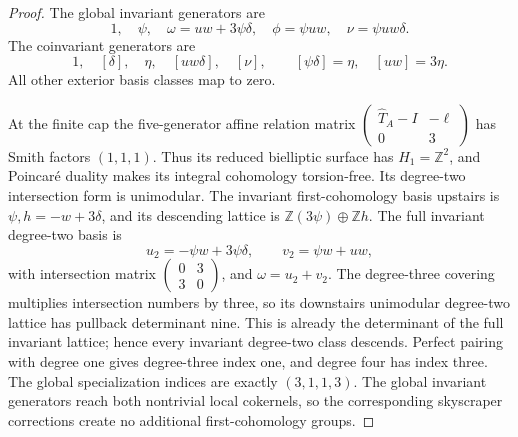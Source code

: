 \begin{proof}
The global invariant generators are \[
 1,\quad\psi,\quad\omega=uw+3\psi\delta,
 \quad\phi=\psi uw,\quad\nu=\psi uw\delta.
\] The coinvariant generators are \[
 1,\quad[\delta],\quad\eta,\quad[uw\delta],\quad[\nu],
 \qquad[\psi\delta]=\eta,\quad[uw]=3\eta.
\] All other exterior basis classes map to zero.

At the finite cap the five-generator affine relation matrix \((\begin{smallmatrix}\widehat T_A-I&-\ell\\0&3\end{smallmatrix})\) has Smith factors \((1,1,1)\). Thus its reduced bielliptic surface has \(H_1=\mathbb Z^2\), and Poincaré duality makes its integral cohomology torsion-free. Its degree-two intersection form is unimodular. The invariant first-cohomology basis upstairs is \(\psi,h=-w+3\delta\), and its descending lattice is \(\mathbb Z(3\psi)\oplus\mathbb Zh\). The full invariant degree-two basis is \[
 u_2=-\psi w+3\psi\delta,\qquad v_2=\psi w+uw,
\] with intersection matrix \((\begin{smallmatrix}0&3\\3&0\end{smallmatrix})\), and \(\omega=u_2+v_2\). The degree-three covering multiplies intersection numbers by three, so its downstairs unimodular degree-two lattice has pullback determinant nine. This is already the determinant of the full invariant lattice; hence every invariant degree-two class descends. Perfect pairing with degree one gives degree-three index one, and degree four has index three. The global specialization indices are exactly \((3,1,1,3)\). The global invariant generators reach both nontrivial local cokernels, so the corresponding skyscraper corrections create no additional first-cohomology groups.


\end{proof}
